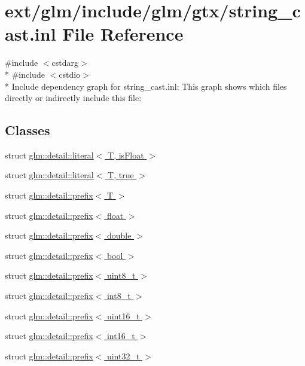 \hypertarget{string__cast_8inl}{\section{ext/glm/include/glm/gtx/string\-\_\-cast.inl File Reference}
\label{string__cast_8inl}
}
{\ttfamily \#include $<$cstdarg$>$}\\*
{\ttfamily \#include $<$cstdio$>$}\\*
Include dependency graph for string\-\_\-cast.\-inl\-:
This graph shows which files directly or indirectly include this file\-:
\subsection*{Classes}
\begin{DoxyCompactItemize}
\item 
struct \hyperlink{structglm_1_1detail_1_1literal}{glm\-::detail\-::literal$<$ T, is\-Float $>$}
\item 
struct \hyperlink{structglm_1_1detail_1_1literal_3_01_t_00_01true_01_4}{glm\-::detail\-::literal$<$ T, true $>$}
\item 
struct \hyperlink{structglm_1_1detail_1_1prefix}{glm\-::detail\-::prefix$<$ T $>$}
\item 
struct \hyperlink{structglm_1_1detail_1_1prefix_3_01float_01_4}{glm\-::detail\-::prefix$<$ float $>$}
\item 
struct \hyperlink{structglm_1_1detail_1_1prefix_3_01double_01_4}{glm\-::detail\-::prefix$<$ double $>$}
\item 
struct \hyperlink{structglm_1_1detail_1_1prefix_3_01bool_01_4}{glm\-::detail\-::prefix$<$ bool $>$}
\item 
struct \hyperlink{structglm_1_1detail_1_1prefix_3_01uint8__t_01_4}{glm\-::detail\-::prefix$<$ uint8\-\_\-t $>$}
\item 
struct \hyperlink{structglm_1_1detail_1_1prefix_3_01int8__t_01_4}{glm\-::detail\-::prefix$<$ int8\-\_\-t $>$}
\item 
struct \hyperlink{structglm_1_1detail_1_1prefix_3_01uint16__t_01_4}{glm\-::detail\-::prefix$<$ uint16\-\_\-t $>$}
\item 
struct \hyperlink{structglm_1_1detail_1_1prefix_3_01int16__t_01_4}{glm\-::detail\-::prefix$<$ int16\-\_\-t $>$}
\item 
struct \hyperlink{structglm_1_1detail_1_1prefix_3_01uint32__t_01_4}{glm\-::detail\-::prefix$<$ uint32\-\_\-t $>$}

\end{DoxyCompactItemize}
